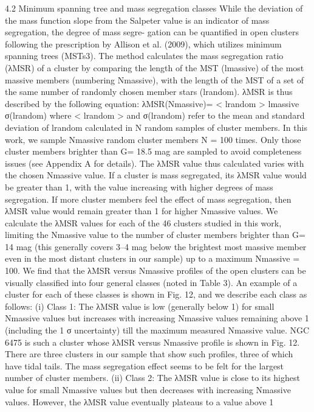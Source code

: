\documentclass[../main.tex]{subfiles}
\begin{document}
{4.2 Minimum spanning tree and mass segregation classes
While the deviation of the mass function slope from the Salpeter
value is an indicator of mass segregation, the degree of mass segre-
gation can be quantified in open clusters following the prescription
by Allison et al. (2009), which utilizes minimum spanning trees
(MSTs3). The method calculates the mass segregation ratio (λMSR)
of a cluster by comparing the length of the MST (lmassive) of the
most massive members (numbering Nmassive), with the length of the
MST of a set of the same number of randomly chosen member stars
(lrandom). λMSR is thus described by the following equation:
λMSR(Nmassive)=
< lrandom >
lmassive
σ(lrandom)
where < lrandom > and σ(lrandom) refer to the mean and standard
deviation of lrandom calculated in N random samples of cluster
members. In this work, we sample Nmassive random cluster members N
= 100 times. Only those cluster members brighter than G= 18.5 mag
are sampled to avoid completeness issues (see Appendix A for
details). The λMSR value thus calculated varies with the chosen
Nmassive value. If a cluster is mass segregated, its λMSR value would
be greater than 1, with the value increasing with higher degrees of
mass segregation. If more cluster members feel the effect of mass
segregation, then λMSR value would remain greater than 1 for higher
Nmassive values.
We calculate the λMSR values for each of the 46 clusters studied
in this work, limiting the Nmassive value to the number of cluster
members brighter than G= 14 mag (this generally covers 3–4 mag
below the brightest most massive member even in the most distant
clusters in our sample) up to a maximum Nmassive = 100. We find that
the λMSR versus Nmassive profiles of the open clusters can be visually
classified into four general classes (noted in Table 3). An example
of a cluster for each of these classes is shown in Fig. 12, and we
describe each class as follows:
(i) Class 1: The λMSR value is low (generally below 1) for small
Nmassive values but increases with increasing Nmassive values remaining
above 1 (including the 1 σ uncertainty) till the maximum measured
Nmassive value. NGC 6475 is such a cluster whose λMSR versus Nmassive
profile is shown in Fig. 12. There are three clusters in our sample
that show such profiles, three of which have tidal tails. The mass
segregation effect seems to be felt for the largest number of cluster
members.
(ii) Class 2: The λMSR value is close to its highest value for small
Nmassive values but then decreases with increasing Nmassive values.
However, the λMSR value eventually plateaus to a value above 1
}
\end{document}
